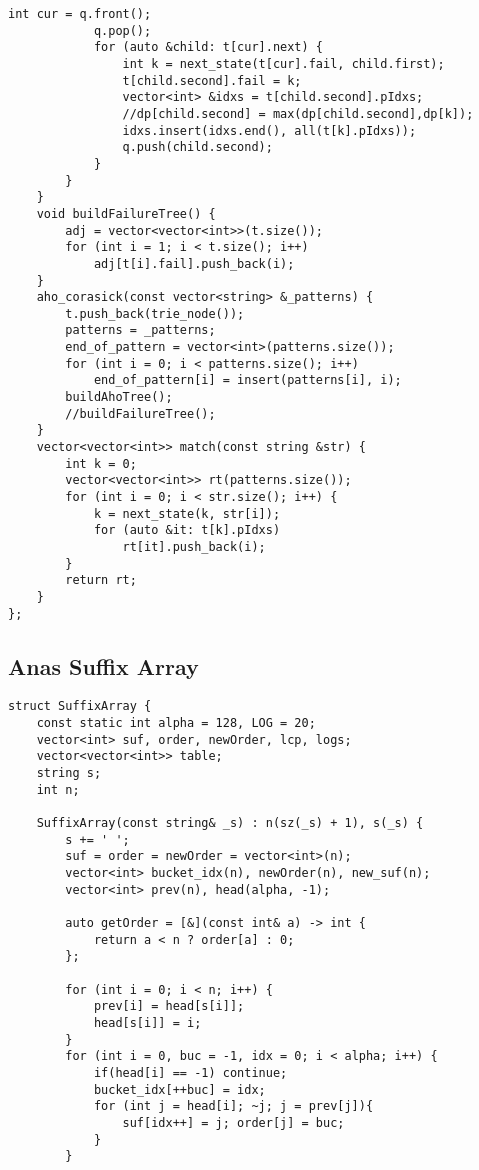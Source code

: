 {\begin{lstlisting}[style=cpp]
            int cur = q.front();  
            q.pop();  
            for (auto &child: t[cur].next) {  
                int k = next_state(t[cur].fail, child.first);  
                t[child.second].fail = k;  
                vector<int> &idxs = t[child.second].pIdxs;  
                //dp[child.second] = max(dp[child.second],dp[k]);  
                idxs.insert(idxs.end(), all(t[k].pIdxs));  
                q.push(child.second);  
            }  
        }  
    }  
    void buildFailureTree() {  
        adj = vector<vector<int>>(t.size());  
        for (int i = 1; i < t.size(); i++)  
            adj[t[i].fail].push_back(i);  
    }  
    aho_corasick(const vector<string> &_patterns) {  
        t.push_back(trie_node());  
        patterns = _patterns;  
        end_of_pattern = vector<int>(patterns.size());  
        for (int i = 0; i < patterns.size(); i++)  
            end_of_pattern[i] = insert(patterns[i], i);  
        buildAhoTree();  
        //buildFailureTree();  
    }  
    vector<vector<int>> match(const string &str) {  
        int k = 0;  
        vector<vector<int>> rt(patterns.size());  
        for (int i = 0; i < str.size(); i++) {  
            k = next_state(k, str[i]);  
            for (auto &it: t[k].pIdxs)  
                rt[it].push_back(i);  
        }  
        return rt;  
    }  
};
\end{lstlisting}

\subsection{Anas Suffix Array}

\begin{lstlisting}[style=cpp]
struct SuffixArray {
    const static int alpha = 128, LOG = 20;
    vector<int> suf, order, newOrder, lcp, logs;
    vector<vector<int>> table;
    string s;
    int n;

    SuffixArray(const string& _s) : n(sz(_s) + 1), s(_s) {
        s += ' ';
        suf = order = newOrder = vector<int>(n);
        vector<int> bucket_idx(n), newOrder(n), new_suf(n);
        vector<int> prev(n), head(alpha, -1);

        auto getOrder = [&](const int& a) -> int {
            return a < n ? order[a] : 0;
        };

        for (int i = 0; i < n; i++) {
            prev[i] = head[s[i]];
            head[s[i]] = i;
        }
        for (int i = 0, buc = -1, idx = 0; i < alpha; i++) {
            if(head[i] == -1) continue;
            bucket_idx[++buc] = idx;
            for (int j = head[i]; ~j; j = prev[j]){
                suf[idx++] = j; order[j] = buc;
            }
        }


\end{lstlisting}}
